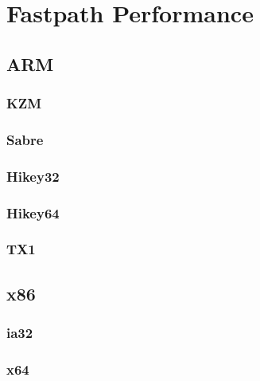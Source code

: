 \chapter{Fastpath Performance}
\section{ARM}
\subsection{KZM}

\clearpage
\subsection{Sabre}

\clearpage
\subsection{Hikey32}

\clearpage
\subsection{Hikey64}

\clearpage
\subsection{TX1}

\clearpage
\section{x86}
\subsection{ia32}

\clearpage
\subsection{x64}

